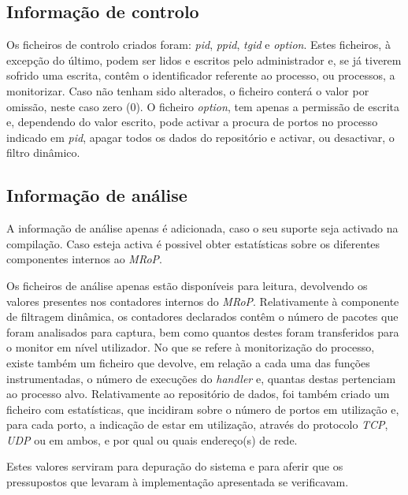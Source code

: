 \subsection{Informação de controlo}

Os ficheiros de controlo criados foram: \textit{pid}, \textit{ppid}, \textit{tgid} e \textit{option}.
Estes ficheiros, à excepção do último, podem ser lidos e escritos pelo administrador e, se já tiverem sofrido uma escrita, contêm o identificador referente ao processo, ou processos, a monitorizar.
Caso não tenham sido alterados, o ficheiro conterá o valor por omissão, neste caso zero (0).
O ficheiro \textit{option}, tem apenas a permissão de escrita e, dependendo do valor escrito, pode activar a procura de portos no processo indicado em \textit{pid}, apagar todos os dados do repositório e activar, ou desactivar, o filtro dinâmico.

\subsection{Informação de análise}
A informação de análise apenas é adicionada, caso o seu suporte seja activado na compilação.
Caso esteja activa é possivel obter estatísticas sobre os diferentes componentes internos ao \textit{MRoP}.

Os ficheiros de análise apenas estão disponíveis para leitura, devolvendo os valores presentes nos contadores internos do \textit{MRoP}.
Relativamente à componente de filtragem dinâmica, os contadores declarados contêm o número de pacotes que foram analisados para captura, bem como quantos destes foram transferidos para o monitor em nível utilizador.
No que se refere à monitorização do processo, existe também um ficheiro que devolve, em relação a cada uma das funções instrumentadas, o número de execuções do \textit{handler} e, quantas destas pertenciam ao processo alvo.
Relativamente ao repositório de dados, foi também criado um ficheiro com estatísticas, que incidiram sobre o número de portos em utilização e, para cada porto, a indicação de estar em utilização, através do protocolo \textit{TCP}, \textit{UDP} ou em ambos, e por qual ou quais endereço(s) de rede.

Estes valores serviram para depuração do sistema e para aferir que os pressupostos que levaram à implementação apresentada se verificavam.



